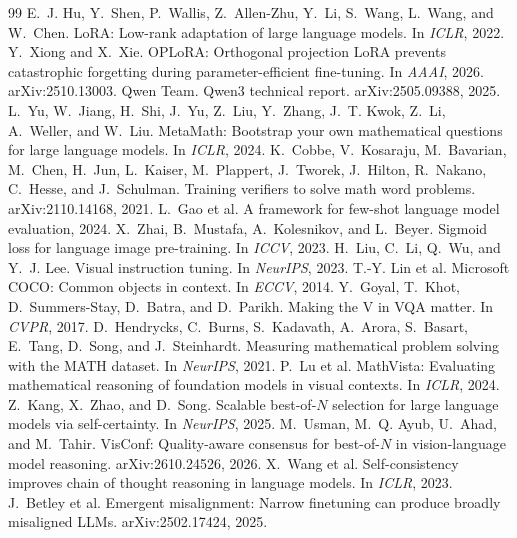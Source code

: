 \documentclass[10pt]{article}
\begin{document}
\begin{thebibliography}{99}\small
{} E.~J. Hu, Y.~Shen, P.~Wallis, Z.~Allen-Zhu, Y.~Li, S.~Wang, L.~Wang, and W.~Chen. LoRA: Low-rank adaptation of large language models. In \emph{ICLR}, 2022.
 Y.~Xiong and X.~Xie. OPLoRA: Orthogonal projection LoRA prevents catastrophic forgetting during parameter-efficient fine-tuning. In \emph{AAAI}, 2026. arXiv:2510.13003.
 Qwen Team. Qwen3 technical report. arXiv:2505.09388, 2025.
 L.~Yu, W.~Jiang, H.~Shi, J.~Yu, Z.~Liu, Y.~Zhang, J.~T. Kwok, Z.~Li, A.~Weller, and W.~Liu. MetaMath: Bootstrap your own mathematical questions for large language models. In \emph{ICLR}, 2024.
 K.~Cobbe, V.~Kosaraju, M.~Bavarian, M.~Chen, H.~Jun, L.~Kaiser, M.~Plappert, J.~Tworek, J.~Hilton, R.~Nakano, C.~Hesse, and J.~Schulman. Training verifiers to solve math word problems. arXiv:2110.14168, 2021.
 L.~Gao et al. A framework for few-shot language model evaluation, 2024.
 X.~Zhai, B.~Mustafa, A.~Kolesnikov, and L.~Beyer. Sigmoid loss for language image pre-training. In \emph{ICCV}, 2023.
 H.~Liu, C.~Li, Q.~Wu, and Y.~J. Lee. Visual instruction tuning. In \emph{NeurIPS}, 2023.
 T.-Y. Lin et al. Microsoft COCO: Common objects in context. In \emph{ECCV}, 2014.
 Y.~Goyal, T.~Khot, D.~Summers-Stay, D.~Batra, and D.~Parikh. Making the V in VQA matter. In \emph{CVPR}, 2017.
 D.~Hendrycks, C.~Burns, S.~Kadavath, A.~Arora, S.~Basart, E.~Tang, D.~Song, and J.~Steinhardt. Measuring mathematical problem solving with the MATH dataset. In \emph{NeurIPS}, 2021.
 P.~Lu et al. MathVista: Evaluating mathematical reasoning of foundation models in visual contexts. In \emph{ICLR}, 2024.
 Z.~Kang, X.~Zhao, and D.~Song. Scalable best-of-$N$ selection for large language models via self-certainty. In \emph{NeurIPS}, 2025.
 M.~Usman, M.~Q. Ayub, U.~Ahad, and M.~Tahir. VisConf: Quality-aware consensus for best-of-$N$ in vision-language model reasoning. arXiv:2610.24526, 2026.
 X.~Wang et al. Self-consistency improves chain of thought reasoning in language models. In \emph{ICLR}, 2023.
 J.~Betley et al. Emergent misalignment: Narrow finetuning can produce broadly misaligned LLMs. arXiv:2502.17424, 2025.
\end{thebibliography}
\end{document}
